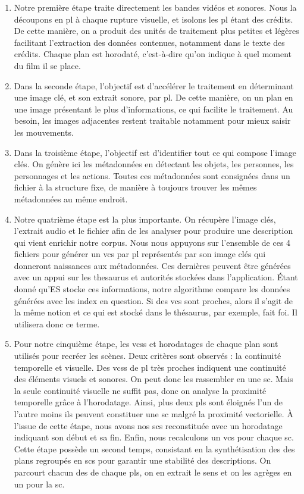 \begin{enumerate}
	\item Notre première étape traite directement les bandes vidéos et sonores. Nous la découpons en \gls{pl} à chaque rupture visuelle, et isolons les \gls{pl} étant des crédits. De cette manière, on a produit des unités de traitement plus petites et légères facilitant l'extraction des données contenues, notamment dans le texte des crédits. Chaque plan est horodaté, c'est-à-dire qu'on indique à quel moment du film il se place.
	
	\item Dans la seconde étape, l'objectif est d'accélérer le traitement en déterminant une image clé, et son extrait sonore, par \gls{pl}. De cette manière, on  un plan en une image présentant le plus d'informations, ce qui facilite le traitement. Au besoin, les images adjacentes restent traitable notamment pour mieux saisir les mouvements.
	
	\item Dans la troisième étape, l'objectif est d'identifier tout ce qui compose l'image clés. On génère ici les métadonnées en détectant les objets, les personnes, les personnages et les actions. Toutes ces métadonnées sont consignées dans un fichier \J à la structure fixe, de manière à toujours trouver les mêmes métadonnées au même endroit.
	
	\item Notre quatrième étape est la plus importante. On récupère l'image clés, l'extrait audio et le fichier \J afin de les analyser pour produire une description qui vient enrichir notre corpus. Nous nous appuyons sur l'ensemble de ces 4 fichiers pour générer un \gls{vcs} par \gls{pl} représentés par son image clés qui donneront naissances aux métadonnées. Ces dernières peuvent être générées avec un appui sur les \gls{thesaurus} et autorités stockées dans l'application. Étant donné qu'\gls{ES} stocke ces informations, notre algorithme compare les données générées avec les index en question. Si des \gls{vcs} sont proches, alors il s'agit de la même notion et ce qui est stocké dans le thésaurus, par exemple, fait foi. Il utilisera donc ce terme.
	
	\item Pour notre cinquième étape, les \glspl{vcs} et horodatages de chaque plan sont utilisés pour recréer les scènes. Deux critères sont observés : la continuité temporelle et visuelle. Des \glspl{vcs} de \gls{pl} très proches indiquent une continuité des éléments visuels et sonores. On peut donc les rassembler en une \gls{sc}. Mais la seule continuité visuelle ne suffit pas, donc on analyse la proximité temporelle grâce à l'horodatage. Ainsi, plus deux \glspl{pl} sont éloignés l'un de l'autre moins ils peuvent constituer une \gls{sc} malgré la proximité vectorielle. À l’issue de cette étape, nous avons nos \glspl{sc} reconstituée avec un horodatage indiquant son début et sa fin. Enfin, nous recalculons un \gls{vcs} pour chaque \gls{sc}. Cette étape possède un second temps, consistant en la synthétisation des \J des plans regroupés en \glspl{sc} pour garantir une stabilité des descriptions. On parcourt chacun des \J de chaque \glspl{pl}, on en extrait le sens et on les agrèges en un \J pour la \gls{sc}. 
	

\end{enumerate}
